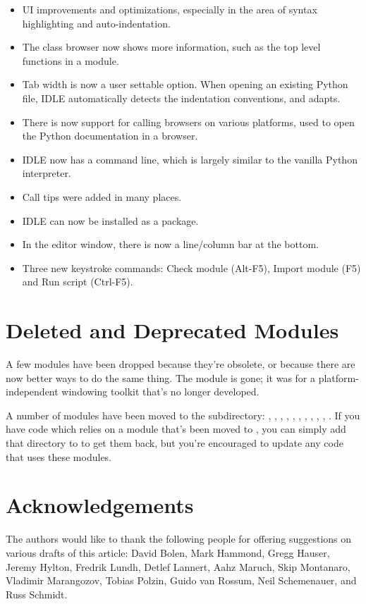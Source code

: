 \documentclass{howto}
\begin{document}
\begin{itemize}
\item  UI improvements and optimizations,
especially in the area of syntax highlighting and auto-indentation.

\item The class browser now shows more information, such as the top
level functions in a module.

\item Tab width is now a user settable option. When opening an existing Python
file, IDLE automatically detects the indentation conventions, and adapts.

\item There is now support for calling browsers on various platforms,
used to open the Python documentation in a browser.

\item IDLE now has a command line, which is largely similar to 
the vanilla Python interpreter.

\item Call tips were added in many places.

\item IDLE can now be installed as a package.

\item In the editor window, there is now a line/column bar at the bottom.

\item Three new keystroke commands: Check module (Alt-F5), Import
module (F5) and Run script (Ctrl-F5).

\end{itemize}

\section{Deleted and Deprecated Modules}

A few modules have been dropped because they're obsolete, or because
there are now better ways to do the same thing.  The 
module is gone; it was for a platform-independent windowing toolkit
that's no longer developed.  

A number of modules have been moved to the
 subdirectory:
, , , , 
, , , 
, , , . 
If you have code which relies on a module  that's been moved to
, you can simply add that directory to   
to get them back, but you're encouraged to update any code that uses
these modules.

\section{Acknowledgements}

The authors would like to thank the following people for offering
suggestions on various drafts of this article: David Bolen, Mark
Hammond, Gregg Hauser, Jeremy Hylton, Fredrik Lundh, Detlef Lannert,
Aahz Maruch, Skip Montanaro, Vladimir Marangozov, Tobias Polzin, Guido
van Rossum, Neil Schemenauer, and Russ Schmidt.
\end{document}
